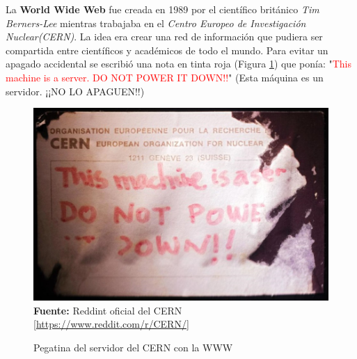 La \textbf{World Wide Web} fue creada en 1989 por el científico británico 
\textit{Tim Berners-Lee} mientras trabajaba en el \textit{Centro Europeo de Investigación 
Nuclear(CERN)}. La idea era crear una red de información que pudiera ser compartida 
entre científicos y académicos de todo el mundo. Para evitar un apagado accidental se escribió 
una nota en tinta roja (Figura \ref*{fig:cern-server}) que ponía: "\textcolor{red}{This machine is a server. DO NOT 
POWER IT DOWN!!}"\cite{cernWeb1} (Esta máquina es un servidor. ¡¡NO LO APAGUEN!!) \\
\begin{figure}[htb!]
    \caption{Pegatina del servidor del CERN con la WWW}
    \label{fig:cern-server}
    \centering
    \includegraphics[scale=0.25]{./Ilustraciones/cern-server.jpg}\\
    \textbf{Fuente:} Reddint oficial del CERN [\url{https://www.reddit.com/r/CERN/}]
\end{figure}


